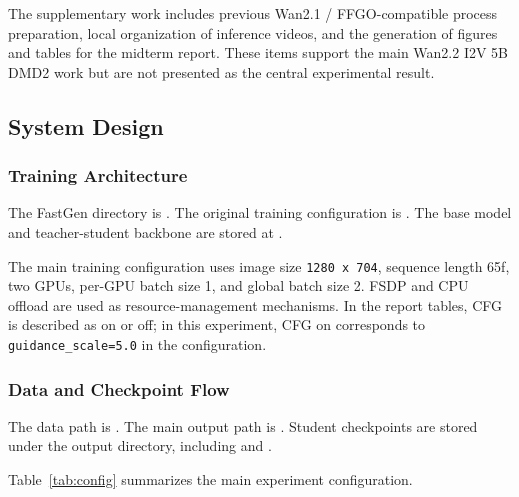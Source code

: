 \documentclass[12pt,a4paper]{article}
\begin{document}
The supplementary work includes previous Wan2.1 / FFGO-compatible process preparation, local organization of inference videos, and the generation of figures and tables for the midterm report. These items support the main Wan2.2 I2V 5B DMD2 work but are not presented as the central experimental result.

\subsection{System Design}

\subsubsection{Training Architecture}

The FastGen directory is . The original training configuration is . The base model and teacher-student backbone are stored at .

The main training configuration uses image size \texttt{1280 x 704}, sequence length 65f, two GPUs, per-GPU batch size 1, and global batch size 2. FSDP and CPU offload are used as resource-management mechanisms. In the report tables, CFG is described as on or off; in this experiment, CFG on corresponds to \texttt{guidance\_scale=5.0} in the configuration.

\subsubsection{Data and Checkpoint Flow}

The data path is . The main output path is . Student checkpoints are stored under the output directory, including  and .

Table~\ref{tab:config} summarizes the main experiment configuration.
\end{document}
